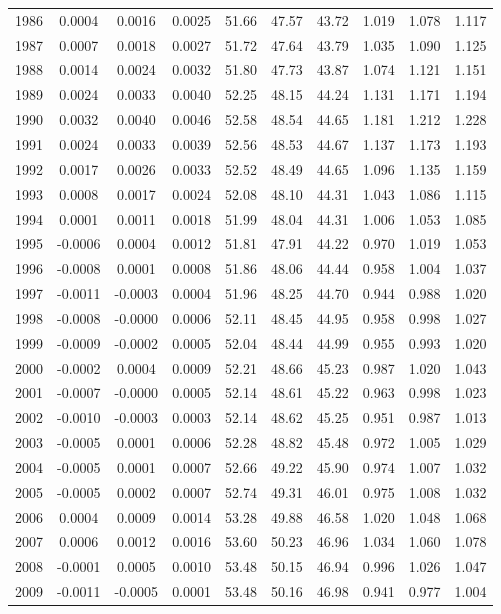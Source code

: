\begin{tabular}{cccccccccc}
  1986 & 0.0004 & 0.0016 & 0.0025 & 51.66 & 47.57 & 43.72 & 1.019 & 1.078 & 1.117 \\ 
  1987 & 0.0007 & 0.0018 & 0.0027 & 51.72 & 47.64 & 43.79 & 1.035 & 1.090 & 1.125 \\ 
  1988 & 0.0014 & 0.0024 & 0.0032 & 51.80 & 47.73 & 43.87 & 1.074 & 1.121 & 1.151 \\ 
  1989 & 0.0024 & 0.0033 & 0.0040 & 52.25 & 48.15 & 44.24 & 1.131 & 1.171 & 1.194 \\ 
  1990 & 0.0032 & 0.0040 & 0.0046 & 52.58 & 48.54 & 44.65 & 1.181 & 1.212 & 1.228 \\ 
  1991 & 0.0024 & 0.0033 & 0.0039 & 52.56 & 48.53 & 44.67 & 1.137 & 1.173 & 1.193 \\ 
  1992 & 0.0017 & 0.0026 & 0.0033 & 52.52 & 48.49 & 44.65 & 1.096 & 1.135 & 1.159 \\ 
  1993 & 0.0008 & 0.0017 & 0.0024 & 52.08 & 48.10 & 44.31 & 1.043 & 1.086 & 1.115 \\ 
  1994 & 0.0001 & 0.0011 & 0.0018 & 51.99 & 48.04 & 44.31 & 1.006 & 1.053 & 1.085 \\ 
  1995 & -0.0006 & 0.0004 & 0.0012 & 51.81 & 47.91 & 44.22 & 0.970 & 1.019 & 1.053 \\ 
  1996 & -0.0008 & 0.0001 & 0.0008 & 51.86 & 48.06 & 44.44 & 0.958 & 1.004 & 1.037 \\ 
  1997 & -0.0011 & -0.0003 & 0.0004 & 51.96 & 48.25 & 44.70 & 0.944 & 0.988 & 1.020 \\ 
  1998 & -0.0008 & -0.0000 & 0.0006 & 52.11 & 48.45 & 44.95 & 0.958 & 0.998 & 1.027 \\ 
  1999 & -0.0009 & -0.0002 & 0.0005 & 52.04 & 48.44 & 44.99 & 0.955 & 0.993 & 1.020 \\ 
  2000 & -0.0002 & 0.0004 & 0.0009 & 52.21 & 48.66 & 45.23 & 0.987 & 1.020 & 1.043 \\ 
  2001 & -0.0007 & -0.0000 & 0.0005 & 52.14 & 48.61 & 45.22 & 0.963 & 0.998 & 1.023 \\ 
  2002 & -0.0010 & -0.0003 & 0.0003 & 52.14 & 48.62 & 45.25 & 0.951 & 0.987 & 1.013 \\ 
  2003 & -0.0005 & 0.0001 & 0.0006 & 52.28 & 48.82 & 45.48 & 0.972 & 1.005 & 1.029 \\ 
  2004 & -0.0005 & 0.0001 & 0.0007 & 52.66 & 49.22 & 45.90 & 0.974 & 1.007 & 1.032 \\ 
  2005 & -0.0005 & 0.0002 & 0.0007 & 52.74 & 49.31 & 46.01 & 0.975 & 1.008 & 1.032 \\ 
  2006 & 0.0004 & 0.0009 & 0.0014 & 53.28 & 49.88 & 46.58 & 1.020 & 1.048 & 1.068 \\ 
  2007 & 0.0006 & 0.0012 & 0.0016 & 53.60 & 50.23 & 46.96 & 1.034 & 1.060 & 1.078 \\ 
  2008 & -0.0001 & 0.0005 & 0.0010 & 53.48 & 50.15 & 46.94 & 0.996 & 1.026 & 1.047 \\ 
  2009 & -0.0011 & -0.0005 & 0.0001 & 53.48 & 50.16 & 46.98 & 0.941 & 0.977 & 1.004 \\ 
   \hline
\end{tabular}
